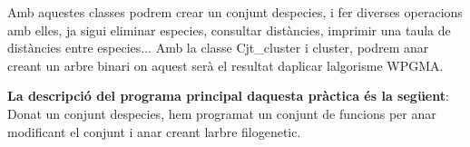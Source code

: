 Amb aquestes classes podrem crear un conjunt d\textquotesingle{}especies, i fer diverses operacions amb elles, ja sigui eliminar especies, consultar distàncies, imprimir una taula de distàncies entre especies... Amb la classe Cjt\+\_\+cluster i cluster, podrem anar creant un arbre binari on aquest serà el resultat d\textquotesingle{}aplicar l\textquotesingle{}algorisme W\+P\+G\+MA.

{\bfseries{La descripció del programa principal d\textquotesingle{}aquesta pràctica és la següent}}\+: Donat un conjunt d\textquotesingle{}especies, hem programat un conjunt de funcions per anar modificant el conjunt i anar creant l\textquotesingle{}arbre filogenetic. 